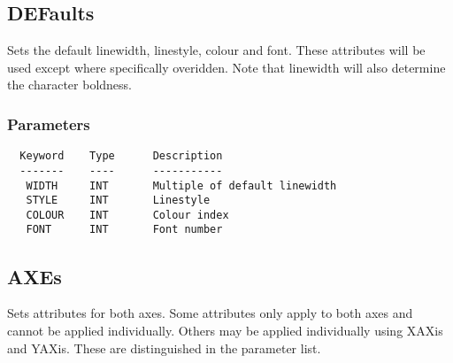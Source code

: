 \documentclass{book}
\renewcommand{\_}{{\tt\char'137}}     %
\begin{document}
\subsection{DEFaults}
Sets the default linewidth, linestyle, colour and font. These
attributes will be used except where specifically overidden. Note
that linewidth will also determine the character boldness.

\subsubsection{Parameters}
\begin{verbatim}
  Keyword    Type      Description
  -------    ----      -----------
   WIDTH     INT       Multiple of default linewidth
   STYLE     INT       Linestyle
   COLOUR    INT       Colour index
   FONT      INT       Font number

\end{verbatim}\subsection{AXEs}
Sets attributes for both axes. Some attributes only apply
to both axes and cannot be applied individually. Others may
be applied individually using XAXis and YAXis. These are
distinguished in the parameter list.
\end{document}
